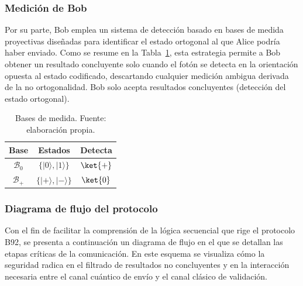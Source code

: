 \subsubsection{Medición de Bob}

Por su parte, Bob emplea un sistema de detección basado en bases de medida proyectivas diseñadas para identificar el estado ortogonal al que Alice podría haber enviado. Como se resume en la Tabla~\ref{tab:medicion_bob}, esta estrategia permite a Bob obtener un resultado concluyente solo cuando el fotón se detecta en la orientación opuesta al estado codificado, descartando cualquier medición ambigua derivada de la no ortogonalidad. Bob solo acepta resultados concluyentes (detección del estado ortogonal).

\begin{table}[h!]
\label{tab:medicion_bob}
\centering
\begin{tabular}{ccc}
\hline
\textbf{Base} & \textbf{Estados} & \textbf{Detecta} \\
\hline
$\mathcal{B}_0$ & $\{|{0}\rangle, |{1}\rangle\}$ & $\ket{+}$ \\
$\mathcal{B}_+$ & $\{|{+}\rangle, |{-}\rangle\}$ & $\ket{0}$ \\
\hline
\end{tabular}
\caption{Bases de medida. Fuente: elaboración propia.}
\end{table}

\subsubsection{Diagrama de flujo del protocolo}

Con el fin de facilitar la comprensión de la lógica secuencial que rige el protocolo B92, se presenta a continuación un diagrama de flujo  en el que se detallan las etapas críticas de la comunicación. En este esquema se visualiza cómo la seguridad radica en el filtrado de resultados no concluyentes y en la interacción necesaria entre el canal cuántico de envío y el canal clásico de validación.

